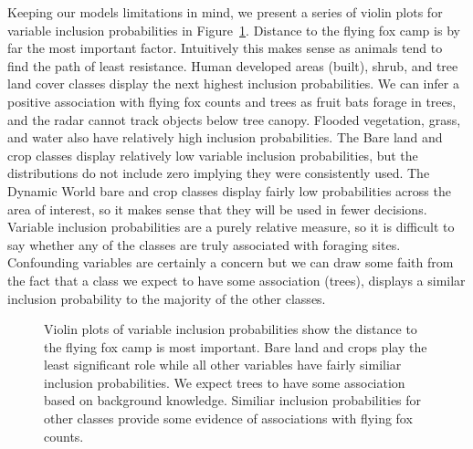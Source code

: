 \documentclass[
  12pt,
  letterpaper,
  DIV=11,
  numbers=noendperiod]{scrartcl}
\begin{document}
Keeping our models limitations in mind, we present a series of violin
plots for variable inclusion probabilities in Figure~\ref{fig-inc_prob}.
Distance to the flying fox camp is by far the most important factor.
Intuitively this makes sense as animals tend to find the path of least
resistance. Human developed areas (built), shrub, and tree land cover
classes display the next highest inclusion probabilities. We can infer a
positive association with flying fox counts and trees as fruit bats
forage in trees, and the radar cannot track objects below tree canopy.
Flooded vegetation, grass, and water also have relatively high inclusion
probabilities. The Bare land and crop classes display relatively low
variable inclusion probabilities, but the distributions do not include
zero implying they were consistently used. The Dynamic World bare and
crop classes display fairly low probabilities across the area of
interest, so it makes sense that they will be used in fewer decisions.
Variable inclusion probabilities are a purely relative measure, so it is
difficult to say whether any of the classes are truly associated with
foraging sites. Confounding variables are certainly a concern but we can
draw some faith from the fact that a class we expect to have some
association (trees), displays a similar inclusion probability to the
majority of the other classes.

\begin{figure}[H]


\caption{\label{fig-inc_prob}Violin plots of variable inclusion
probabilities show the distance to the flying fox camp is most
important. Bare land and crops play the least significant role while all
other variables have fairly similiar inclusion probabilities. We expect
trees to have some association based on background knowledge. Similiar
inclusion probabilities for other classes provide some evidence of
associations with flying fox counts.}

\end{figure}%
\end{document}
